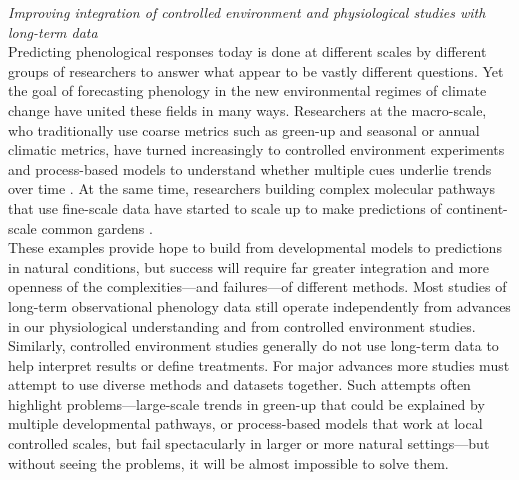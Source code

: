 \documentclass[11pt,letter]{article}
\begin{document}
\emph{Improving integration of controlled environment and physiological studies with long-term data}\\
Predicting phenological responses today is done at different scales by different groups of researchers to answer what appear to be vastly different questions. Yet the goal of forecasting phenology in the new environmental regimes of climate change have united these fields in many ways. Researchers at the macro-scale, who traditionally use coarse metrics such as green-up and seasonal or annual climatic metrics, have turned increasingly to controlled environment experiments and process-based models to understand whether multiple cues underlie trends over time \citep[e.g.,][]{fu2019}. At the same time, researchers building complex molecular pathways that use fine-scale data have started to scale up to make predictions of continent-scale common gardens \citep{Wilczek:2009oa}.\\

These examples provide hope to build from developmental models to predictions in natural conditions, but success will require far greater integration and more openness of the complexities---and failures---of different methods. Most studies of long-term observational phenology data still operate independently from advances in our physiological understanding and from controlled environment studies. Similarly, controlled environment studies generally do not use long-term data to help interpret results or define treatments. For major advances more studies must attempt to use diverse methods and datasets together. Such attempts often highlight problems---large-scale trends in green-up that could be explained by multiple developmental pathways, or process-based models that work at local controlled scales, but fail spectacularly in larger or more natural settings---but without seeing the problems, it will be almost impossible to solve them.\\
\end{document}
